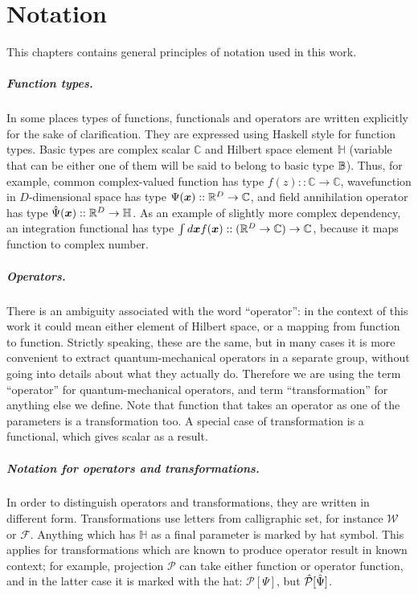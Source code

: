 \chapter{Notation}
\label{cha:appendix:notation}

This chapters contains general principles of notation used in this work.

\paragraph{Function types.}
In some places types of functions, functionals and operators are written explicitly for the sake of clarification.
They are expressed using Haskell style for function types.
Basic types are complex scalar $\mathbb{C}$ and Hilbert space element $\mathbb{H}$ (variable that can be either one of them will be said to belong to basic type $\mathbb{B}$).
Thus, for example, common complex-valued function has type $f(z) :: \mathbb{C} \rightarrow \mathbb{C}$,
wavefunction in $D$-dimensional space has type $\Psi(\boldsymbol{x}) :: \mathbb{R}^D \rightarrow \mathbb{C}$,
and field annihilation operator has type $\hat{\Psi}(\boldsymbol{x}) :: \mathbb{R}^D \rightarrow \mathbb{H}$.
As an example of slightly more complex dependency,
an integration functional has type $\int d\boldsymbol{x} f(\boldsymbol{x}) :: (\mathbb{R}^D \rightarrow \mathbb{C}) \rightarrow \mathbb{C}$,
because it maps function to complex number.

\paragraph{Operators.}
There is an ambiguity associated with the word ``operator'':
in the context of this work it could mean either element of Hilbert space, or a mapping from function to function.
Strictly speaking, these are the same, but in many cases it is more convenient to extract quantum-mechanical operators in a separate group, without going into details about what they actually do.
Therefore we are using the term ``operator'' for quantum-mechanical operators,
and term ``transformation'' for anything else we define.
Note that function that takes an operator as one of the parameters is a transformation too.
A special case of transformation is a functional, which gives scalar as a result.

\paragraph{Notation for operators and transformations.}
In order to distinguish operators and transformations, they are written in different form.
Transformations use letters from calligraphic set, for instance $\mathcal{W}$ or $\mathcal{F}$.
Anything which has $\mathbb{H}$ as a final parameter is marked by hat symbol.
This applies for transformations which are known to produce operator result in known context;
for example, projection $\mathcal{P}$ can take either function or operator function,
and in the latter case it is marked with the hat: $\mathcal{P}[\Psi]$, but $\hat{\mathcal{P}}[\hat{\Psi}]$.

